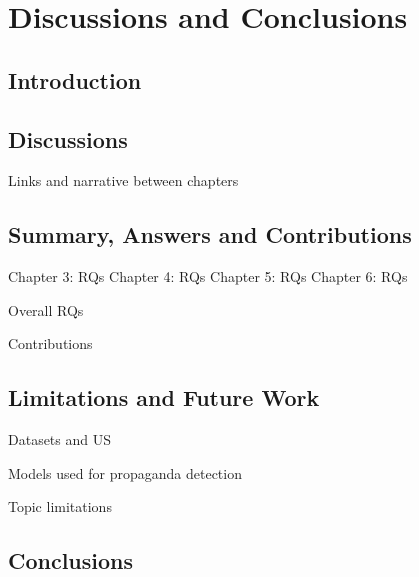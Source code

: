 \chapter{\statusred Discussions and Conclusions}

\section{Introduction}

\section{Discussions}

Links and narrative between chapters

\section{Summary, Answers and Contributions}

Chapter 3: RQs
Chapter 4: RQs
Chapter 5: RQs
Chapter 6: RQs

Overall RQs


Contributions

\section{Limitations and Future Work}

Datasets and US

Models used for propaganda detection

Topic limitations

\section{Conclusions}